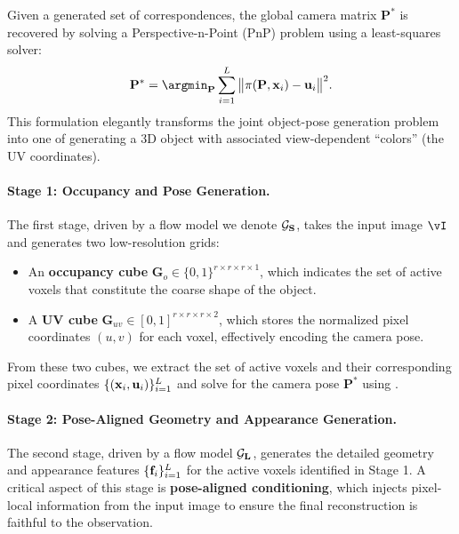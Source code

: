 \documentclass[../../book-main.tex]{subfiles}
\begin{document}
Given a generated set of correspondences, the global camera matrix $\mathbf{P}^{*}$ is recovered by solving a Perspective-n-Point (PnP) problem using a least-squares solver:
\begin{equation}
\mathbf{P}^{*} = \argmin_{\mathbf{P}} \sum_{i=1}^{\numpts} \big\|\pi(\mathbf{P},\point_i) - \pixcoord_i\big\|^2.
\label{eq:pnp_solve}
\end{equation}
This formulation elegantly transforms the joint object-pose generation problem into one of generating a 3D object with associated view-dependent ``colors'' (the UV coordinates).

\paragraph{Stage 1: Occupancy and Pose Generation.}

The first stage, driven by a flow model we denote $\mathbf{\mathcal{G}_{S}}$, takes the input image $\image$ and generates two low-resolution grids:
\begin{itemize}
\item An \textbf{occupancy cube} $\mathbf{G}_o \in \{0,1\}^{r \times r \times r \times 1}$, which indicates the set of active voxels that constitute the coarse shape of the object.
\item A \textbf{UV cube} $\mathbf{G}_{uv} \in [0,1]^{r \times r \times r \times 2}$, which stores the normalized pixel coordinates $(u,v)$ for each voxel, effectively encoding the camera pose.
\end{itemize}
From these two cubes, we extract the set of active voxels and their corresponding pixel coordinates $\{(\mathbf{x}_i, \mathbf{u}_i)\}_{i=1}^{L}$ and solve for the camera pose $\mathbf{P}^{*}$ using .

\paragraph{Stage 2: Pose-Aligned Geometry and Appearance Generation.}

The second stage, driven by a flow model $\mathbf{\mathcal{G}_{L}}$, generates the detailed geometry and appearance features $\{\mathbf{f}_i\}_{i=1}^{L}$ for the active voxels identified in Stage 1. A critical aspect of this stage is \textbf{pose-aligned conditioning}, which injects pixel-local information from the input image to ensure the final reconstruction is faithful to the observation.
\end{document}
